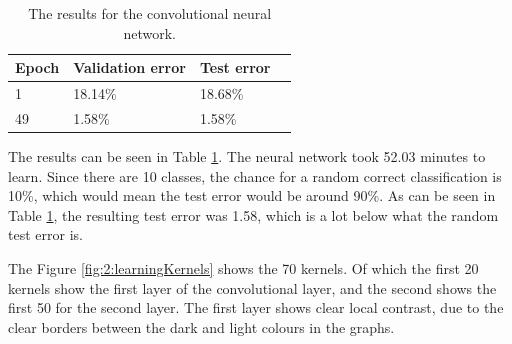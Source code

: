 \begin{table}[ht!]
\centering
\begin{tabular}{llll}
\textbf{Epoch} & \textbf{Validation error} & \textbf{Test error}\\ \hline
1              & 18.14\%                   & 18.68\%                       \\
49             & 1.58\%                    & 1.58\%                        \\                    
\end{tabular}
\caption{The results for the convolutional neural network.}
\label{results2}
\end{table}

The results can be seen in Table \ref{results2}. The neural network took 52.03 minutes to learn. Since there are 10 classes, the chance for a random correct classification is 10\%, which would mean the test error would be around 90\%. As can be seen in Table \ref{results2}, the resulting test error was 1.58, which is a lot below what the random test error is. 

The Figure \ref{fig:2:learningKernels} shows the 70 kernels. Of which the first 20 kernels show the first layer of the convolutional layer, and the second shows the first 50 for the second layer. The first layer shows clear local contrast, due to the clear borders between the dark and light colours in the graphs.


